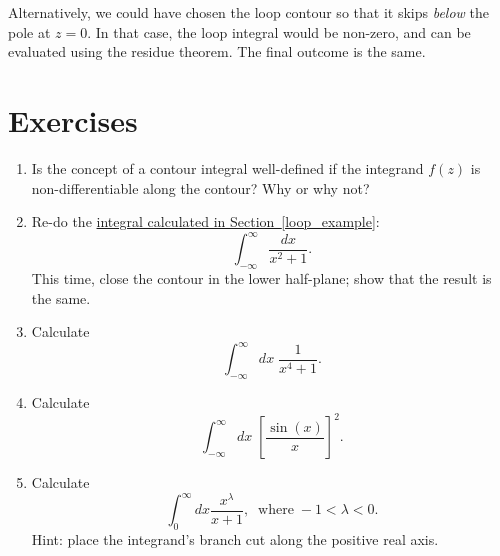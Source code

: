 \documentclass[10pt,a4paper]{article}
\begin{document}
Alternatively, we could have chosen the loop contour so that it skips
\emph{below} the pole at $z = 0$. In that case, the loop integral
would be non-zero, and can be evaluated using the residue theorem. The
final outcome is the same.

\section{Exercises}\label{exercises}

\begin{enumerate}
\item
Is the concept of a contour integral well-defined if the integrand
$f(z)$ is non-differentiable along the contour? Why or why not?

\item
Re-do the \hyperref[loop_example]{integral calculated in
  Section~\ref{loop_example}}:
\begin{equation}
\int_{-\infty}^\infty \frac{dx}{x^2 + 1}.
\end{equation}
This time, close the contour in the lower half-plane; show that the
result is the same.

\item
Calculate 
\begin{equation}
  \int_{-\infty}^\infty dx\; \frac{1}{x^4 + 1}.
\end{equation}

\item
Calculate
\begin{equation}
  \int_{-\infty}^\infty dx\; \left[\frac{\sin(x)}{x}\right]^2.
\end{equation}

\item
Calculate
\begin{equation}
  \int_0^\infty dx \frac{x^{\lambda}}{x+1}, \;\;\mathrm{where}\; -1 < \lambda < 0.
\end{equation}
Hint: place the integrand's branch cut along the positive real axis.
\end{enumerate}
\end{document}
